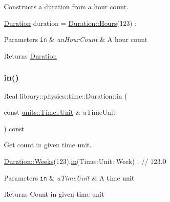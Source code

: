 Constructs a duration from a hour count. 


\begin{DoxyCode}
\hyperlink{classlibrary_1_1physics_1_1time_1_1_duration_a0a70efcf487a841da572afcf00001f64}{Duration} duration = \hyperlink{classlibrary_1_1physics_1_1time_1_1_duration_aadef86b1b803b8764380ef623f99ce95}{Duration::Hours}(123) ;
\end{DoxyCode}



\begin{DoxyParams}[1]{Parameters}
\mbox{\tt in}  & {\em an\+Hour\+Count} & A hour count \\
\hline
\end{DoxyParams}
\begin{DoxyReturn}{Returns}
\hyperlink{classlibrary_1_1physics_1_1time_1_1_duration}{Duration} 
\end{DoxyReturn}
\mbox{\label{classlibrary_1_1physics_1_1time_1_1_duration_ace9b1e589d3dc6e76002d389e2a480df}} 
\subsubsection{\texorpdfstring{in()}{in()}}
{\footnotesize\ttfamily Real library\+::physics\+::time\+::\+Duration\+::in (\begin{DoxyParamCaption}\item[{const \hyperlink{classlibrary_1_1physics_1_1units_1_1_time_ab876a6a05c9a2f28905f2753bfd64109}{units\+::\+Time\+::\+Unit} \&}]{a\+Time\+Unit }\end{DoxyParamCaption}) const}



Get count in given time unit. 


\begin{DoxyCode}
\hyperlink{classlibrary_1_1physics_1_1time_1_1_duration_ae9d507f6cbb36902529b28d3721507c1}{Duration::Weeks}(123).\hyperlink{classlibrary_1_1physics_1_1time_1_1_duration_ace9b1e589d3dc6e76002d389e2a480df}{in}(Time::Unit::Week) ; \textcolor{comment}{// 123.0}
\end{DoxyCode}



\begin{DoxyParams}[1]{Parameters}
\mbox{\tt in}  & {\em a\+Time\+Unit} & A time unit \\
\hline
\end{DoxyParams}
\begin{DoxyReturn}{Returns}
Count in given time unit 
\end{DoxyReturn}
\mbox{\label{classlibrary_1_1physics_1_1time_1_1_duration_a73ebd929416f360ff5c4c840fbcae67b}} 
